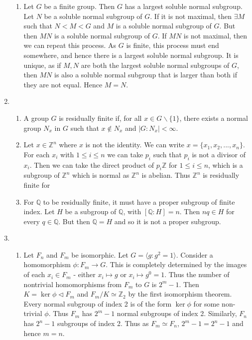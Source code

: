 \documentclass[]{article}
\begin{document}
\begin{enumerate}
\begin{enumerate}
			\item Let $G$ be a finite group. Then $G$ has a largest soluble normal subgroup. Let $N$ be a soluble normal subgroup of $G$. If it is not maximal, then $\exists M$ such that $N<M<G$ and $M$ is a soluble normal subgroup of $G$. But then $MN$ is a soluble normal subgroup of $G$. If $MN$ is not maximal, then we can repeat this process. As $G$ is finite, this process must end somewhere, and hence there is a largest soluble normal subgroup. It is unique, as if $M,N$ are both the largest soluble normal subgroups of $G$, then $MN$ is also a soluble normal subgroup that is larger than both if they are not equal. Hence $M=N$.
		\end{enumerate}
		\item %
		\begin{enumerate}
			\item A group $G$ is residually finite if, for all $x\in G\backslash \{1\}$, there exists a normal group $N_x$ in $G$ such that $x\not\in N_x$ and $|G:N_x|<\infty$.
			\item Let $x\in \mathbb{Z}^n$ where $x$ is not the identity. We can write $x=\{x_1, x_2,...,x_n \}$. For each $x_i$ with $1\leq i\leq n$ we can take $p_i$ such that $p_i$ is not a divisor of $x_i$. Then we can take the direct product of $p_i\mathbb{Z}$ for $1\leq i\leq n$, which is a subgroup of $\mathbb{Z}^n$ which is normal as $\mathbb{Z}^n$ is abelian. Thus $\mathbb{Z}^n$ is residually finite for %
			\item For $\mathbb{Q}$ to be residually finite, it must have a proper subgroup of finite index. Let $H$ be a subgroup of $\mathbb{Q}$, with $[\mathbb{Q}:H]=n$. Then $nq\in H$ for every $q\in \mathbb{Q}$. But then $\mathbb{Q}=H$ and so it is not a proper subgroup.
		\end{enumerate}
		\item %
		\begin{enumerate}
			\item Let $F_n$ and $F_m$ be isomorphic. Let $G=\langle g:g^2=1\rangle$. Consider a homomorphism $\phi: F_m\to G$. This is completely determined by the images of each $x_i\in F_m$ - either $x_i\mapsto g$ or $x_i\mapsto g^0=1$. Thus the number of nontrivial homomorphisms from $F_m$ to $G$ is $2^m-1$. Then $K=\ker\phi\vartriangleleft F_m$ and $F_m/K\simeq \mathbb{Z}_2$ by the first isomorphism theorem. Every normal subgroup of index 2 is of the form $\ker\phi$ for some non-trivial $\phi$. Thus $F_m$ has $2^m-1$ normal subgroups of index 2. Similarly, $F_n$ has $2^n-1$ subgroups of index 2. Thus as $F_m\simeq F_n$, $2^m-1=2^n-1$ and hence $m=n$.

\end{enumerate}
\end{enumerate}
\end{document}
